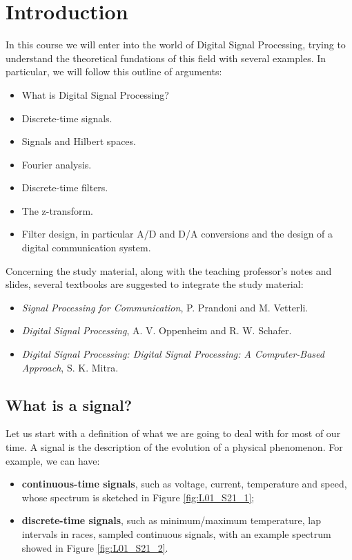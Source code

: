 \documentclass[../../main/main.tex]{subfiles}
\begin{document}
\chapter{Introduction}


In this course we will enter into the world of Digital Signal Processing, trying to understand the theoretical fundations of this field with several examples. In particular, we will follow this outline of arguments:
\begin{itemize}
    \item What is Digital Signal Processing?
    \item Discrete-time signals.
    \item Signals and Hilbert spaces.
    \item Fourier analysis.
    \item Discrete-time filters.
    \item The z-transform.
    \item Filter design, in particular A/D and D/A conversions and the design of a digital communication system.
\end{itemize}

Concerning the study material, along with the teaching professor's notes and slides, several textbooks are suggested to integrate the study material:
\begin{itemize}
    \item[\cite{sp4comm}] \textit{Signal Processing for Communication}, P. Prandoni and M. Vetterli.
    \item[\cite{oppenheim}] \textit{Digital Signal Processing}, A. V. Oppenheim and R. W. Schafer.
    \item[\cite{mitra}] \textit{Digital Signal Processing: Digital Signal Processing: A Computer-Based Approach}, S. K. Mitra.
\end{itemize}





\section{What is a signal?}
Let us start with a definition of what we are going to deal with for most of our time. A signal is the description of the evolution of a physical phenomenon. For example, we can have:
\begin{itemize}
    \item \textbf{continuous-time signals}, such as voltage, current, temperature and speed, whose spectrum is sketched in Figure \ref{fig:L01_S21_1};
    \item \textbf{discrete-time signals}, such as minimum/maximum temperature, lap intervals in races, sampled continuous signals, with an example spectrum showed in Figure \ref{fig:L01_S21_2}.
\end{itemize}
\end{document}
